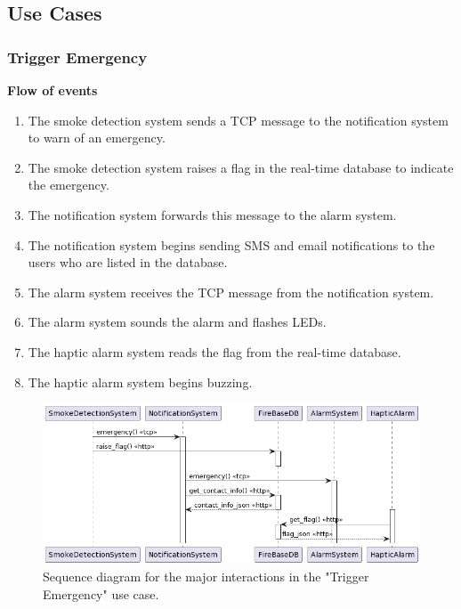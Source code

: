 \subsection{Use Cases} \label{s:use-cases}

\subsubsection{Trigger Emergency}

\textbf{Flow of events}
\begin{enumerate}
    \item The smoke detection system sends a TCP message to the notification system to warn of an emergency.
    \item The smoke detection system raises a flag in the real-time database to indicate the emergency.
    \item The notification system forwards this message to the alarm system.
    \item The notification system begins sending SMS and email notifications to the users who are listed in the database.
    \item The alarm system receives the TCP message from the notification system.
    \item The alarm system sounds the alarm and flashes LEDs.
    \item The haptic alarm system reads the flag from the real-time database.
    \item The haptic alarm system begins buzzing.
\end{enumerate}

\begin{figure}[H]
    \centering
    \includegraphics[width=\linewidth]{../assets/FANSAlarmUseCaseSequence.png}
    \caption{Sequence diagram for the major interactions in the "Trigger Emergency" use case.}
\end{figure}
